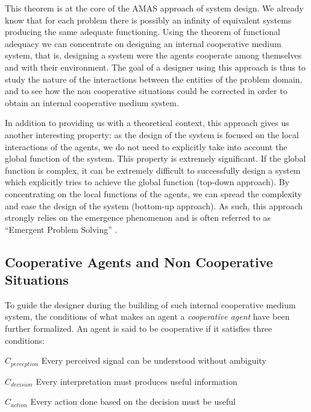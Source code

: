 
This theorem is at the core of the AMAS approach of system design. We already know that for each problem there is possibly an infinity of equivalent systems producing the same adequate functioning. Using the theorem of functional adequacy we can concentrate on designing an internal cooperative medium system, that is, designing a system were the agents cooperate among themselves and with their environment. The goal of a designer using this approach is thus to study the nature of the interactions between the entities of the problem domain, and to see how the non cooperative situations could be corrected in order to obtain an internal cooperative medium system.

In addition to providing us with a theoretical context, this approach gives us another interesting property: as the design of the system is focused on the local interactions of the agents, we do not need to explicitly take into account the global function of the system. This property is extremely significant. If the global function is complex, it can be extremely difficult to successfully design a system which explicitly tries to achieve the global function (top-down approach). By concentrating on the local functions of the agents, we can spread the complexity and ease the design of the system (bottom-up approach). As such, this approach strongly relies on the emergence phenomenon and is often referred to as \enquote{Emergent Problem Solving} \cite{quinqueton2000emergent}.

\subsection{Cooperative Agents and Non Cooperative Situations}

To guide the designer during the building of such internal cooperative medium system, the conditions of what makes an agent a \emph{cooperative agent} have been further formalized. An agent is said to be cooperative if it satisfies three conditions:
\begin{compactitem}
\item $C_{perception}$ Every perceived signal can be understood without ambiguity
\item $C_{decision}$ Every interpretation must produces useful information
\item $C_{action}$ Every action done based on the decision must be useful
\end{compactitem}

